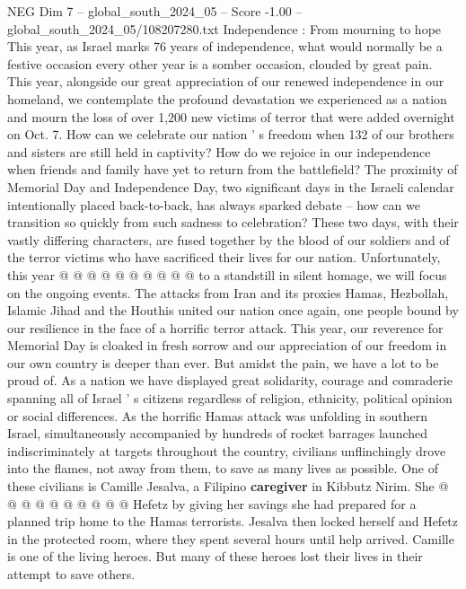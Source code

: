\begin{textsample}{NEG Dim 7 – global\_south\_2024\_05 – Score -1.00 – global\_south\_2024\_05/108207280.txt}  \label{ex:f7_neg_241}
Independence : From mourning to hope This year, as Israel marks 76 years of independence, what would normally be a festive occasion every other year is a somber occasion, clouded by great pain.
This year, alongside our great appreciation of our renewed independence in our homeland, we contemplate the profound devastation we experienced as a nation and mourn the loss of over 1,200 new victims of terror that were added overnight on Oct. 7.
How can we celebrate our nation ' s freedom when 132 of our brothers and sisters are still held in captivity?
How do we rejoice in our independence when friends and family have yet to return from the battlefield?
The proximity of Memorial Day and Independence Day, two significant days in the Israeli calendar intentionally placed back-to-back, has always sparked debate -- how can we transition so quickly from such sadness to celebration?
These two days, with their vastly differing characters, are fused together by the blood of our soldiers and of the terror victims who have sacrificed their lives for our nation.
Unfortunately, this year @ @ @ @ @ @ @ @ @ @ to a standstill in silent homage, we will focus on the ongoing events.
The attacks from Iran and its proxies Hamas, Hezbollah, Islamic Jihad and the Houthis united our nation once again, one people bound by our resilience in the face of a horrific terror attack.
This year, our reverence for Memorial Day is cloaked in fresh sorrow and our appreciation of our freedom in our own country is deeper than ever.
But amidst the pain, we have a lot to be proud of.
As a nation we have displayed great solidarity, courage and comraderie spanning all of Israel ' s citizens regardless of religion, ethnicity, political opinion or social differences.
As the horrific Hamas attack was unfolding in southern Israel, simultaneously accompanied by hundreds of rocket barrages launched indiscriminately at targets throughout the country, civilians unflinchingly drove into the flames, not away from them, to save as many lives as possible.
One of these civilians is Camille Jesalva, a Filipino \textbf{caregiver} in Kibbutz Nirim.
She @ @ @ @ @ @ @ @ @ @ Hefetz by giving her savings she had prepared for a planned trip home to the Hamas terrorists.
Jesalva then locked herself and Hefetz in the protected room, where they spent several hours until help arrived.
Camille is one of the living heroes.
But many of these heroes lost their lives in their attempt to save others.

\end{textsample}
